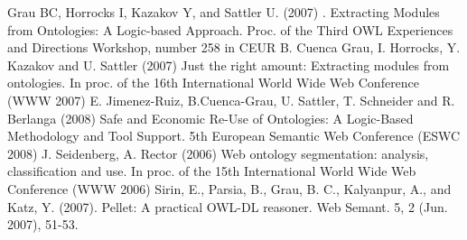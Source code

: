 \documentclass{ao2e}%
\begin{document}
\begin{thebibliography}{}





Grau BC, Horrocks I, Kazakov Y, and Sattler U. (2007) . Extracting Modules from Ontologies: A Logic-based Approach. Proc. of the Third OWL Experiences and Directions Workshop, number 258 in CEUR 
 B. Cuenca Grau, I. Horrocks, Y. Kazakov and U. Sattler (2007) Just the right amount: Extracting modules from ontologies. In proc. of the 16th International World Wide Web Conference (WWW 2007) 
 E. Jimenez-Ruiz, B.Cuenca-Grau, U. Sattler, T. Schneider and R. Berlanga (2008) Safe and Economic Re-Use of Ontologies: A Logic-Based Methodology and Tool Support. 5th European Semantic Web Conference (ESWC 2008) 
 J. Seidenberg, A. Rector (2006) Web ontology segmentation: analysis, classification and use. In proc. of the 15th International World Wide Web Conference (WWW 2006) 
 Sirin, E., Parsia, B., Grau, B. C., Kalyanpur, A., and Katz, Y. (2007). Pellet: A practical OWL-DL reasoner. Web Semant. 5, 2 (Jun. 2007), 51-53. 
 
 
 

\end{thebibliography}
\end{document}
